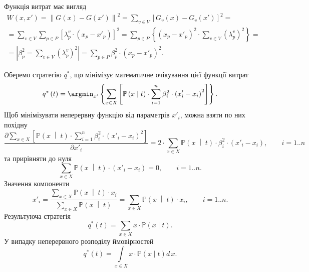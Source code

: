 Функція витрат має вигляд
\begin{equation*}
  \begin{split}
    W \left( x, x' \right)
    = \left\| G\left( x \right) - G\left( x' \right) \right\|^2
    = \sum_{v \in V} \left[
        G_v\left( x \right) - G_v\left( x' \right)
      \right]^2 = \\
    = \sum_{v \in V} \sum_{p \in P} \left[
        \lambda_p^v \cdot \left( x_p - x'_p \right)
      \right]^2
    = \sum_{p \in P} \left\{ \left( x_p - x'_p \right)^2
      \cdot \sum_{v \in V} \left( \lambda_p^v \right)^2 \right\} = \\
    = \left| \beta_p^2 = \sum_{v \in V} \left( \lambda_p^v \right)^2 \right|
    = \sum_{p \in P} \beta_p^2 \cdot \left( x_p - x'_p \right)^2.
  \end{split}
\end{equation*}

Оберемо стратегію $q^*$,
що мінімізує математичне очікування цієї функції витрат
\begin{equation*}
  q^* \left( t \right)
  = \argmin_{x'} \left\{
    \sum\limits_{x \in X} \left[
        \mathbb{P} \left( x \;\middle|\;  t \right)
        \cdot \sum_{i = 1}^n \beta_i^2 \cdot \left( x'_i - x_i \right)^2
      \right]
    \right\}.
\end{equation*}
Щоб мінімізувати неперервну функцію від параметрів $x'_i$,
можна взяти по них похідну
\begin{equation*}
  \frac{\partial \sum\limits_{x \in X} \left[
      \mathbb{P} \left( x \;\middle|\;  t \right)
      \cdot \sum\limits_{i = 1}^n \beta_i^2 \cdot \left( x'_i - x_i \right)^2
  \right]}{\partial x'_i}
  = 2 \cdot \sum_{x \in X} \mathbb{P} \left( x \;\middle|\;  t \right)
    \cdot \beta_i^2 \cdot \left( x'_i - x_i \right), \qquad i = 1..n
\end{equation*}
та прирівняти до нуля
\begin{equation*}
  \sum_{x \in X} \mathbb{P} \left( x \;\middle|\;  t \right)
  \cdot \left( x'_i - x_i \right) = 0, \qquad i = 1..n.
\end{equation*}
Значення компоненти
\begin{equation*}
  x'_i = \frac{\sum\limits_{x \in X}
    \mathbb{P} \left( x \;\middle|\;  t \right) \cdot x_i}
    {\sum\limits_{x \in X}
      \mathbb{P} \left( x \;\middle|\;  t \right)}
  = \sum\limits_{x \in X}
    \mathbb{P} \left( x \;\middle|\;  t \right) \cdot x_i, \qquad i = 1..n.
\end{equation*}
Результуюча стратегія
\begin{equation*}
  q^*\left( t \right)
  = \sum_{x \in X} x \cdot \mathbb{P}\left( x \mid t \right).
\end{equation*}
У випадку неперервного розподілу ймовірностей
\begin{equation*}
  q^*\left( t \right)
  = \int\limits_{x \in X} x \cdot \mathbb{P}\left( x \mid t \right) d\,x.
\end{equation*}

